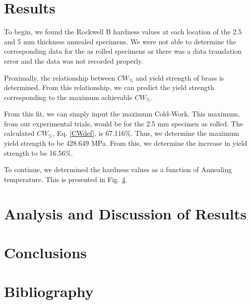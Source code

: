 \documentclass{article}
\begin{document}
\section{Results}
To begin, we found the Rockwell B hardness values at each location of the 2.5 and 5 mm thickness annealed specimens. We were not able to determine the corresponding data for the as rolled specimens as there was a data translation error and the data was not recorded properly. 

Proximally, the relationship between $CW_{\%}$ and yield strength of brass is determined. From this relationship, we can predict the yield strength corresponding to the maximum achievable $CW_{\%}$. 


From this fit, we can simply input the maximum Cold-Work. This maximum, from our experimental trials, would be for the 2.5 mm specimen as rolled. The calculated $CW_{\%}$, Eq. \ref{CWdef}, is 67.116\%. Thus, we determine the maximum yield strength to be 428.649 MPa. From this, we determine the increase in yield strength to be 16.56\%. 

To continue, we determined the hardness values as a function of Annealing temperature. This is presented in Fig. \ref{}.


\section{Analysis and Discussion of Results}

\section{Conclusions}

\section{Bibliography}
\printbibliography[heading=none]
\end{document}
